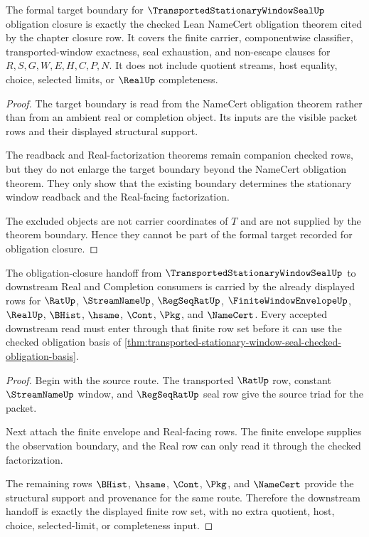 \begin{theorem}
\label{thm:transported-stationary-window-seal-formal-target-boundary}
The formal target boundary for $\TransportedStationaryWindowSealUp$ obligation closure is exactly the checked Lean NameCert obligation theorem cited by the chapter closure row. It covers the finite carrier, componentwise classifier, transported-window exactness, seal exhaustion, and non-escape clauses for $R,S,G,W,E,H,C,P,N$. It does not include quotient streams, host equality, choice, selected limits, or $\RealUp$ completeness.
\end{theorem}
\begin{proof}
The target boundary is read from the NameCert obligation theorem rather than from an ambient real or completion object. Its inputs are the visible packet rows and their displayed structural support.

The readback and Real-factorization theorems remain companion checked rows, but they do not enlarge the target boundary beyond the NameCert obligation theorem. They only show that the existing boundary determines the stationary window readback and the Real-facing factorization.

The excluded objects are not carrier coordinates of $T$ and are not supplied by the theorem boundary. Hence they cannot be part of the formal target recorded for obligation closure.
\end{proof}

\begin{theorem}
\label{thm:transported-stationary-window-seal-obligation-closure-handoff}
The obligation-closure handoff from $\TransportedStationaryWindowSealUp$ to downstream Real and Completion consumers is carried by the already displayed rows for $\RatUp$, $\StreamNameUp$, $\RegSeqRatUp$, $\FiniteWindowEnvelopeUp$, $\RealUp$, $\BHist$, $\hsame$, $\Cont$, $\Pkg$, and $\NameCert$. Every accepted downstream read must enter through that finite row set before it can use the checked obligation basis of \autoref{thm:transported-stationary-window-seal-checked-obligation-basis}.
\end{theorem}
\begin{proof}
Begin with the source route. The transported $\RatUp$ row, constant $\StreamNameUp$ window, and $\RegSeqRatUp$ seal row give the source triad for the packet.

Next attach the finite envelope and Real-facing rows. The finite envelope supplies the observation boundary, and the Real row can only read it through the checked factorization.

The remaining rows $\BHist$, $\hsame$, $\Cont$, $\Pkg$, and $\NameCert$ provide the structural support and provenance for the same route. Therefore the downstream handoff is exactly the displayed finite row set, with no extra quotient, host, choice, selected-limit, or completeness input.
\end{proof}
